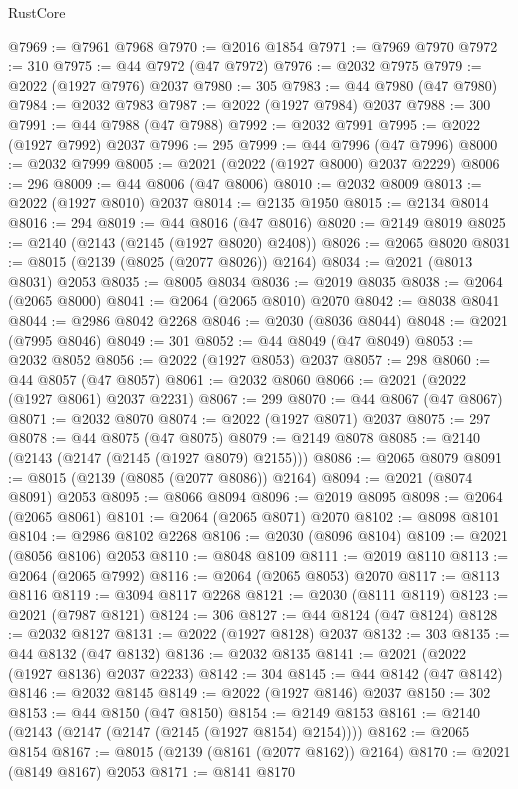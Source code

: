 \begin{lexlean}{RustCore}
\begin{coremodule}
@7969 := @7961 @7968
@7970 := @2016 @1854
@7971 := @7969 @7970
@7972 := 310
@7975 := @44 @7972 (@47 @7972)
@7976 := @2032 @7975
@7979 := @2022 (@1927 @7976) @2037
@7980 := 305
@7983 := @44 @7980 (@47 @7980)
@7984 := @2032 @7983
@7987 := @2022 (@1927 @7984) @2037
@7988 := 300
@7991 := @44 @7988 (@47 @7988)
@7992 := @2032 @7991
@7995 := @2022 (@1927 @7992) @2037
@7996 := 295
@7999 := @44 @7996 (@47 @7996)
@8000 := @2032 @7999
@8005 := @2021 (@2022 (@1927 @8000) @2037 @2229)
@8006 := 296
@8009 := @44 @8006 (@47 @8006)
@8010 := @2032 @8009
@8013 := @2022 (@1927 @8010) @2037
@8014 := @2135 @1950
@8015 := @2134 @8014
@8016 := 294
@8019 := @44 @8016 (@47 @8016)
@8020 := @2149 @8019
@8025 := @2140 (@2143 (@2145 (@1927 @8020) @2408))
@8026 := @2065 @8020
@8031 := @8015 (@2139 (@8025 (@2077 @8026)) @2164)
@8034 := @2021 (@8013 @8031) @2053
@8035 := @8005 @8034
@8036 := @2019 @8035
@8038 := @2064 (@2065 @8000)
@8041 := @2064 (@2065 @8010) @2070
@8042 := @8038 @8041
@8044 := @2986 @8042 @2268
@8046 := @2030 (@8036 @8044)
@8048 := @2021 (@7995 @8046)
@8049 := 301
@8052 := @44 @8049 (@47 @8049)
@8053 := @2032 @8052
@8056 := @2022 (@1927 @8053) @2037
@8057 := 298
@8060 := @44 @8057 (@47 @8057)
@8061 := @2032 @8060
@8066 := @2021 (@2022 (@1927 @8061) @2037 @2231)
@8067 := 299
@8070 := @44 @8067 (@47 @8067)
@8071 := @2032 @8070
@8074 := @2022 (@1927 @8071) @2037
@8075 := 297
@8078 := @44 @8075 (@47 @8075)
@8079 := @2149 @8078
@8085 := @2140 (@2143 (@2147 (@2145 (@1927 @8079) @2155)))
@8086 := @2065 @8079
@8091 := @8015 (@2139 (@8085 (@2077 @8086)) @2164)
@8094 := @2021 (@8074 @8091) @2053
@8095 := @8066 @8094
@8096 := @2019 @8095
@8098 := @2064 (@2065 @8061)
@8101 := @2064 (@2065 @8071) @2070
@8102 := @8098 @8101
@8104 := @2986 @8102 @2268
@8106 := @2030 (@8096 @8104)
@8109 := @2021 (@8056 @8106) @2053
@8110 := @8048 @8109
@8111 := @2019 @8110
@8113 := @2064 (@2065 @7992)
@8116 := @2064 (@2065 @8053) @2070
@8117 := @8113 @8116
@8119 := @3094 @8117 @2268
@8121 := @2030 (@8111 @8119)
@8123 := @2021 (@7987 @8121)
@8124 := 306
@8127 := @44 @8124 (@47 @8124)
@8128 := @2032 @8127
@8131 := @2022 (@1927 @8128) @2037
@8132 := 303
@8135 := @44 @8132 (@47 @8132)
@8136 := @2032 @8135
@8141 := @2021 (@2022 (@1927 @8136) @2037 @2233)
@8142 := 304
@8145 := @44 @8142 (@47 @8142)
@8146 := @2032 @8145
@8149 := @2022 (@1927 @8146) @2037
@8150 := 302
@8153 := @44 @8150 (@47 @8150)
@8154 := @2149 @8153
@8161 := @2140 (@2143 (@2147 (@2147 (@2145 (@1927 @8154) @2154))))
@8162 := @2065 @8154
@8167 := @8015 (@2139 (@8161 (@2077 @8162)) @2164)
@8170 := @2021 (@8149 @8167) @2053
@8171 := @8141 @8170

\end{coremodule}
\end{lexlean}

